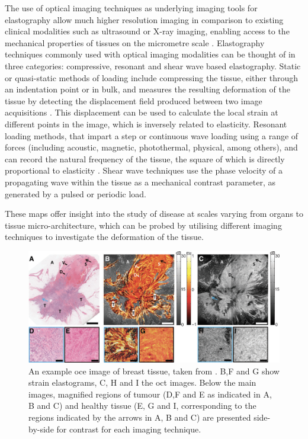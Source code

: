 The use of optical imaging techniques as underlying imaging tools for elastography allow much higher resolution imaging in comparison to existing clinical modalities such as ultrasound or X-ray imaging, enabling access to the mechanical properties of tissues on the micrometre scale \cite{schmitt_oct_1998} \cite{kennedy_review_2014}. Elastography techniques commonly used with optical imaging modalities can be thought of in three categories: compressive, resonant and shear wave based elastography. Static or quasi-static methods of loading include compressing the tissue, either through an indentation point or in bulk, and measures the resulting deformation of the tissue by detecting the displacement field produced between two image acquisitions \cite{kennedy_optical_2014}. This displacement can be used to calculate the local strain at different points in the image, which is inversely related to elasticity. Resonant loading methods, that impart a step or continuous wave loading using a range of forces (including acoustic, magnetic, photothermal, physical, among others), and can record the natural frequency of the tissue, the square of which is directly proportional to elasticity \cite{kennedy_optical_2015}. Shear wave techniques use the phase velocity of a propagating wave within the tissue as a mechanical contrast parameter, as generated by a pulsed or periodic load. 

These maps offer insight into the study of disease at scales varying from organs to tissue micro-architecture, which can be probed by utilising different imaging techniques to investigate the deformation of the tissue.

\begin{figure}[t!]
	\centering
    \includegraphics[width=\textwidth]{bground_figs/oce_example.png}
	\caption{An example \ac{oce} image of breast tissue, taken from \cite{kennedy_investigation_2015}. B,F and G show strain elastograms, C, H and I the \ac{oct} images. Below the main images, magnified regions of tumour (D,F and E as indicated in A, B and C) and healthy tissue (E, G and I, corresponding to the regions indicated by the arrows in A, B and C) are presented side-by-side for contrast for each imaging technique.}
    \label{oce_example}	
\end{figure}

